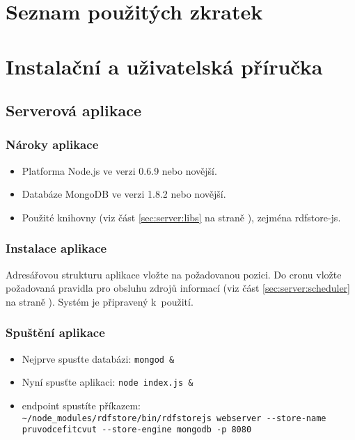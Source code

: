 \chapter{Seznam použitých zkratek}
\renewcommand{\glossarysection}[2][]{}
\printglossary[type=acronym]






\chapter{Instalační a uživatelská příručka}
\section{Serverová aplikace}
\subsection{Nároky aplikace}
\begin{itemize}
 \item Platforma Node.js ve verzi 0.6.9 nebo novější.
 \item Databáze MongoDB ve verzi 1.8.2 nebo novější.
 \item Použité knihovny (viz část \ref{sec:server:libs} na straně \pageref{sec:server:libs}), zejména rdfstore-js.
\end{itemize}

\subsection{Instalace aplikace}
Adresářovou strukturu aplikace vložte na požadovanou pozici. Do cronu vložte požadovaná pravidla pro obsluhu zdrojů informací (viz část \ref{sec:server:scheduler} na straně \pageref{sec:server:scheduler}). Systém je připravený k~použití.

\subsection{Spuštění aplikace}
\begin{itemize}
 \item Nejprve spusťte databázi: \texttt{mongod \&}
 \item Nyní spusťte aplikaci: \texttt{node index.js \&}
 \item {} endpoint spustíte příkazem: \\ \texttt{\textasciitilde /node\_modules/rdfstore/bin/rdfstorejs webserver \linebreak -{}-store-name pruvodcefitcvut -{}-store-engine mongodb -p 8080}
\end{itemize}

